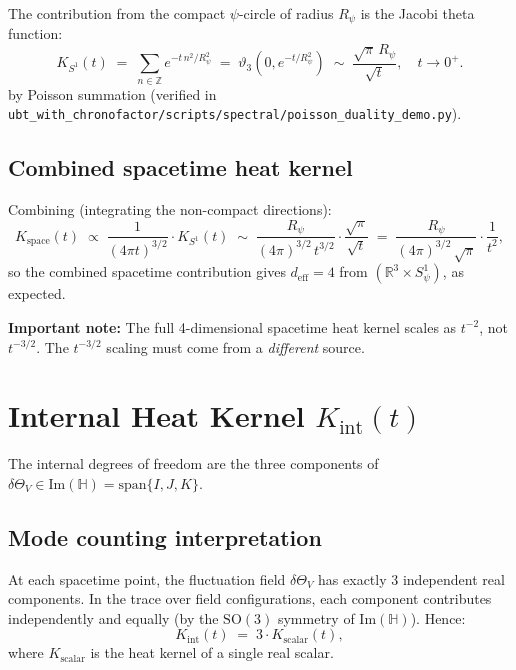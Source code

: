 \documentclass[11pt,a4paper]{article}
\theoremstyle{definition}
\theoremstyle{remark}
\begin{document}
The contribution from the compact $\psi$-circle of radius $R_\psi$ is the
Jacobi theta function:
\begin{equation}
  K_{S^1}(t) \;=\; \sum_{n \in \mathbb{Z}} e^{-t\,n^2/R_\psi^2}
  \;=\; \vartheta_3\!\left(0, e^{-t/R_\psi^2}\right)
  \;\sim\; \frac{\sqrt{\pi}\,R_\psi}{\sqrt{t}}, \quad t \to 0^+.
  \label{eq:K_S1}
\end{equation}
by Poisson summation (verified in
\texttt{ubt\_with\_chronofactor/scripts/spectral/poisson\_duality\_demo.py}).

\subsection{Combined spacetime heat kernel}

Combining (integrating the non-compact directions):
\begin{equation}
  K_{\mathrm{space}}(t)
  \;\propto\; \frac{1}{(4\pi t)^{3/2}} \cdot K_{S^1}(t)
  \;\sim\; \frac{R_\psi}{(4\pi)^{3/2}\,t^{3/2}} \cdot \frac{\sqrt{\pi}}{\sqrt{t}}
  \;=\; \frac{R_\psi}{(4\pi)^{3/2}\,\sqrt{\pi}} \cdot \frac{1}{t^{2}},
  \label{eq:K_space_combined}
\end{equation}
so the combined spacetime contribution gives $d_{\mathrm{eff}} = 4$ from
$(\mathbb{R}^3 \times S^1_\psi)$, as expected.

\textbf{Important note:}
The full 4-dimensional spacetime heat kernel scales as $t^{-2}$,
not $t^{-3/2}$.
The $t^{-3/2}$ scaling must come from a \emph{different} source.

\section{Internal Heat Kernel $K_{\mathrm{int}}(t)$}
\label{sec:K_int}

The internal degrees of freedom are the three components of
$\delta\Theta_V \in \mathrm{Im}(\mathbb{H}) = \mathrm{span}\{I, J, K\}$.

\subsection{Mode counting interpretation}

At each spacetime point, the fluctuation field
$\delta\Theta_V$ has exactly 3 independent real components.
In the trace over field configurations,
each component contributes independently and equally (by the $\mathrm{SO}(3)$
symmetry of $\mathrm{Im}(\mathbb{H})$).
Hence:
\begin{equation}
  K_{\mathrm{int}}(t) \;=\; 3 \cdot K_{\mathrm{scalar}}(t),
  \label{eq:K_int_naive}
\end{equation}
where $K_{\mathrm{scalar}}$ is the heat kernel of a single real scalar.
\end{document}
